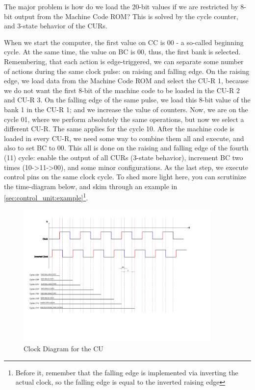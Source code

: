 The major problem is how do we load the 20-bit values if we are restricted by 8-bit output from the Machine Code ROM? This is solved by the cycle counter, and 3-state behavior of the CURs. 

When we start the computer, the first value on CC is 00 - a so-called beginning cycle. At the same time, the value on BC is 00, thus, the first bank is selected. Remembering, that each action is edge-triggered, we can separate some number of actions during the same clock pulse: on raising and falling edge. On the raising edge, we load data from the Machine Code ROM and select the CU-R 1, because we do not want the first 8-bit of the machine code to be loaded in the CU-R 2 and CU-R 3. On the falling edge of the same pulse, we load this 8-bit value of the bank 1 in the CU-R 1; and we increase the value of counters. Now, we are on the cycle 01, where we perform absolutely the same operations, but now we select a different CU-R. The same applies for the cycle 10. After the machine code is loaded in every CU-R, we need some way to combine them all and execute, and also to set BC to 00. This all is done on the raising and falling edge of the fourth (11) cycle: enable the output of all CURs (3-state behavior), increment BC two times (10->11->00), and some minor configurations. As the last step, we execute control pins on the same clock cycle. To shed more light here, you can scrutinize the time-diagram below, and skim through an example in \ref{sec:control_unit:example}\footnote{Before it, remember that the falling edge is implemented via inverting the actual clock, so the falling edge is equal to the inverted raising edge}.


\begin{figure}[H]
	\centering
	\includegraphics[width=0.9\textwidth]{img/CU_clock}
	\caption{Clock Diagram for the CU}
	\label{fig:cu_clock_diagram}
\end{figure}


